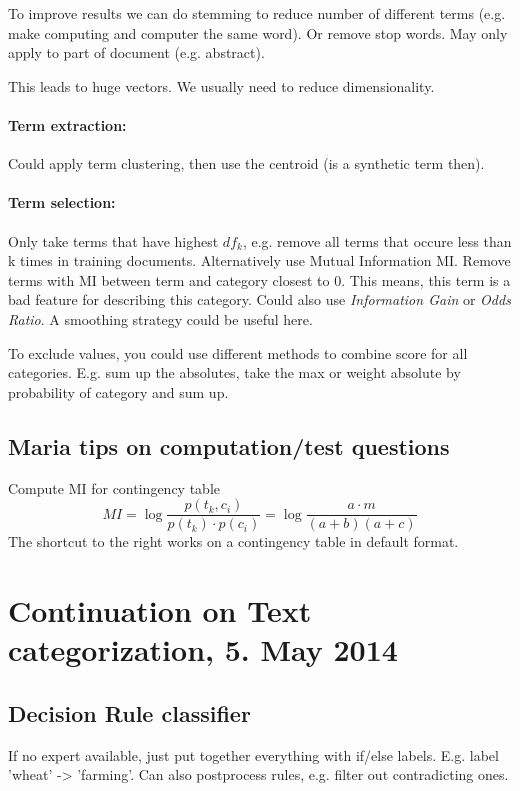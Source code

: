\documentclass[11pt]{article}
\begin{document}
To improve results we can do stemming to reduce number of different terms (e.g. make
computing and computer the same word). Or remove stop words. May only apply to part
of document (e.g. abstract).

This leads to huge vectors. We usually need
to reduce dimensionality. 
\paragraph{Term extraction:} Could apply term clustering, then use the centroid (is a synthetic term then).
\paragraph{Term selection:} Only take terms
that have highest $df_k$, e.g. remove
all terms that occure less than k times
in training documents. Alternatively use Mutual Information MI. Remove terms with MI between term and category closest to 0.
This means, this term is a bad feature for describing this category.
Could also use \emph{Information Gain} or \emph{Odds Ratio}. 
A smoothing strategy could be useful here.

To exclude values, you could use different methods to combine score for all categories. E.g. sum up the absolutes, take the max or weight absolute by probability of category and sum up.

\subsection{Maria tips on computation/test questions}
Compute MI for contingency table
\begin{equation}
	MI = \log \frac{p(t_k, c_i)}{p(t_k)\cdot p(c_i)} = \log \frac{a \cdot m}{(a + b) (a + c)}
\end{equation}
The shortcut to the right works on a contingency table in default format. 

\section{Continuation on Text categorization, 5. May 2014}
\subsection{Decision Rule classifier}
If no expert available, just put together everything with if/else labels. E.g. label 'wheat' -> 'farming'. Can also postprocess rules, e.g. filter out contradicting ones. 
\end{document}
